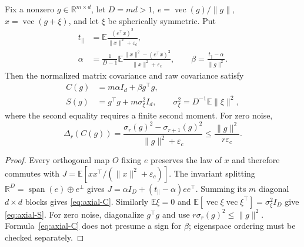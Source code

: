 \begin{proposition}
\label{prop:axial-covariance}
Fix a nonzero $g\in\mathbb R^{m\times d}$, let $D=md>1$,
$e=\operatorname{vec}(g)/\|g\|$, $x=\operatorname{vec}(g+\xi)$,
and let $\xi$ be spherically symmetric. Put
\begin{align}
 t_\parallel&=\mathbb E\frac{(e^\top x)^2}{\|x\|^2+\varepsilon_c},\\
 \alpha&=\frac1{D-1}\mathbb E
       \frac{\|x\|^2-(e^\top x)^2}{\|x\|^2+\varepsilon_c},\qquad
 \beta=\frac{t_\parallel-\alpha}{\|g\|^2}.
\end{align}
Then the normalized matrix covariance and raw covariance satisfy
\begin{align}
 C(g)&=m\alpha I_d+\beta g^\top g,\label{eq:axial-C}\\
 S(g)&=g^\top g+m\sigma_\xi^2I_d,
 \qquad \sigma_\xi^2=D^{-1}\mathbb E\|\xi\|^2,
 \label{eq:axial-S}
\end{align}
where the second equality requires a finite second moment.
For zero noise,
\begin{equation}
 \Delta_r(C(g))=
 \frac{\sigma_r(g)^2-\sigma_{r+1}(g)^2}{\|g\|^2+\varepsilon_c}
 \le\frac{\|g\|^2}{r\varepsilon_c}.\label{eq:deterministic-gap-collapse}
\end{equation}
\end{proposition}
\begin{proof}
Every orthogonal map $O$ fixing $e$ preserves the law of $x$ and therefore
commutes with $J=\mathbb E[xx^\top/(\|x\|^2+\varepsilon_c)]$.
The invariant splitting $\mathbb R^D=\operatorname{span}(e)\oplus e^\perp$
gives $J=\alpha I_D+(t_\parallel-\alpha)ee^\top$.
Summing its $m$ diagonal $d\times d$ blocks gives \eqref{eq:axial-C}.
Similarly $\mathbb E\xi=0$ and
$\mathbb E[\operatorname{vec}\xi\operatorname{vec}\xi^\top]=\sigma_\xi^2I_D$
give \eqref{eq:axial-S}. For zero noise, diagonalize $g^\top g$ and use
$r\sigma_r(g)^2\le\|g\|^2$. Formula~\eqref{eq:axial-C} does not presume a
sign for $\beta$; eigenspace ordering must be checked separately.
\end{proof}


